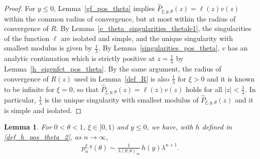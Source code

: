 \documentclass[12pt]{article}
\newcommand{\1}{\mathds{1}}
\theoremstyle{definition}
\theoremstyle{plain}
\newtheorem{Lemma}[definition]{Lemma}
\theoremstyle{remark}
\begin{document}
\begin{proof}
    For $y\le 0$, Lemma~\ref{gf_pos_theta} implies $\hat{P}_{\xi,y,\theta}(z)=\ell(z)v(z)$ within the common radius of convergence, but at most within the radius of convergence of $R$. By Lemma~\ref{e_theta_singularities_thetale1}, the singularities of the function $\ell$ are isolated and simple, and the unique singularity with smallest modulus is given by $\frac{1}{\lambda}$. By Lemma~\ref{singularities_pos_theta}, $v$ has an analytic continuation which is strictly positive at $z=\frac{1}{\lambda}$ by Lemma~\ref{h_eigenfct_pos_theta}. By the same argument, the radius of convergence of $R(z)$ used in Lemma~\ref{def_R} is also $\frac{1}{\lambda}$ for $\xi>0$ and it is known to be infinite for $\xi=0$, so that $\hat{P}_{\xi,y,\theta}(z)=\ell(z)v(z)$ holds for all $|z|<\frac{1}{\lambda}$. In particular, $\frac{1}{\lambda}$ is the unique singularity with smallest modulus of $\hat{P}_{\xi,y,\theta}(z)$ and it is simple and isolated.
\end{proof}
\begin{Lemma}\label{asymptotic_pos_theta_neg_y}
  For $0<\theta<1$, $\xi\in[0,1)$ and $y\le 0$, we have, with $h$ defined in \eqref{def_h_pos_theta_2}, as $n\to\infty$,
  \begin{align*}
       p_n^{\xi,y}(\theta)\sim \frac{1}{\lambda(\theta;\theta)_\infty}\,h(y)\lambda^{n+1}.
  \end{align*}
\end{Lemma}
\end{document}
